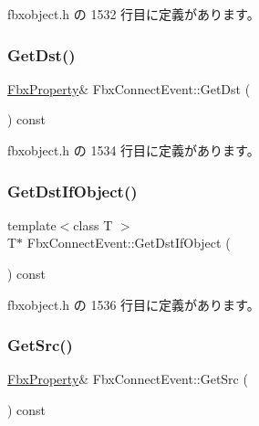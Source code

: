  fbxobject.\+h の 1532 行目に定義があります。

\mbox{\label{class_fbx_connect_event_a2b6176e2e3ce7e308909971b7534fd38}} 
\subsubsection{\texorpdfstring{Get\+Dst()}{GetDst()}}
{\footnotesize\ttfamily \hyperlink{class_fbx_property}{Fbx\+Property}\& Fbx\+Connect\+Event\+::\+Get\+Dst (\begin{DoxyParamCaption}{ }\end{DoxyParamCaption}) const\hspace{0.3cm}{\ttfamily [inline]}}



 fbxobject.\+h の 1534 行目に定義があります。

\mbox{\label{class_fbx_connect_event_a7b52443ca2c001639f5776ee3540538a}} 
\subsubsection{\texorpdfstring{Get\+Dst\+If\+Object()}{GetDstIfObject()}}
{\footnotesize\ttfamily template$<$class T $>$ \\
T$\ast$ Fbx\+Connect\+Event\+::\+Get\+Dst\+If\+Object (\begin{DoxyParamCaption}{ }\end{DoxyParamCaption}) const\hspace{0.3cm}{\ttfamily [inline]}}



 fbxobject.\+h の 1536 行目に定義があります。

\mbox{\label{class_fbx_connect_event_adc2a02fd551701700f1d0921d7e96a73}} 
\subsubsection{\texorpdfstring{Get\+Src()}{GetSrc()}}
{\footnotesize\ttfamily \hyperlink{class_fbx_property}{Fbx\+Property}\& Fbx\+Connect\+Event\+::\+Get\+Src (\begin{DoxyParamCaption}{ }\end{DoxyParamCaption}) const\hspace{0.3cm}{\ttfamily [inline]}}



